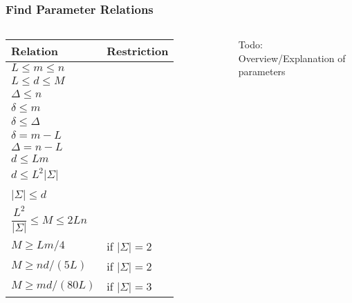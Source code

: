 \begin{frame}
	\frametitle{Find Parameter Relations}
	
	\begin{columns}[onlytextwidth]
	\begin{tabular}{ll}
		\toprule
		\textbf{Relation} & \textbf{Restriction} \\
		\midrule
		$L \leq m \leq n$     &  \\
		$L \leq d \leq M$     &  \\
		$\Delta \leq n$       &  \\
		$\delta \leq m$       &  \\
		$\delta \leq \Delta$  &  \\
		\midrule
		$\delta = m - L$      &  \\
		$\Delta = n - L$      &  \\
		\midrule
		$d \leq Lm$               & \\
		$d \leq L^2 |\Sigma|$     & \\
		\alt<2->{\color{KITgreen}$\boxed{d \leq 2L(\Delta + 1)}$}{$d \leq 2L(\Delta + 1)$}   & \\
		$|\Sigma| \leq d$         & \\
		$\dfrac{L^2}{|\Sigma|} \leq M \leq 2Ln$ & \\
		\midrule
		$M \geq Lm/4$             & if $|\Sigma| = 2$ \\
		$M \geq nd/(5L)$          & if $|\Sigma| = 2$ \\
		\midrule
		$M \geq md/(80L)$         & if $|\Sigma| = 3$ \\
		\bottomrule
	\end{tabular}
	
	Todo: Overview/Explanation of parameters
	\end{columns}

\end{frame}





